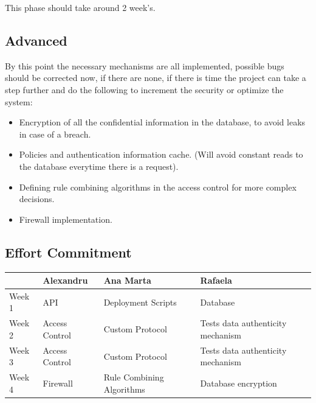 This phase should take around 2 week's.


\subsection{Advanced}

By this point the necessary mechanisms are all implemented, possible bugs should be corrected now, if there are none, if there is time the project can take a step further and do the following to increment the security or optimize the system:

\begin{itemize}
	\item Encryption of all the confidential information in the database, to avoid leaks in case of a breach.
	\item Policies and authentication information cache. (Will avoid constant reads to the database everytime there is a request).
	\item Defining rule combining algorithms in the access control for  more complex decisions.
	\item Firewall implementation.
\end{itemize}


\subsection{Effort Commitment}

\begin{tabularx}{0.8\textwidth} { 
  | >{\centering\arraybackslash}X 
  | >{\centering\arraybackslash}X 
  | >{\centering\arraybackslash}X 
  | >{\centering\arraybackslash}X | }
 \hline
  & Alexandru & Ana Marta & Rafaela \\
 \hline
 Week 1  & API & Deployment Scripts & Database \\
  \hline
  Week 2  & Access Control  & Custom Protocol & Tests data authenticity mechanism \\
   \hline
   Week 3  & Access Control  & Custom Protocol  & Tests data authenticity mechanism \\
    \hline
    Week 4  & Firewall  & Rule Combining Algorithms  & Database encryption \\
\hline
\end{tabularx}


